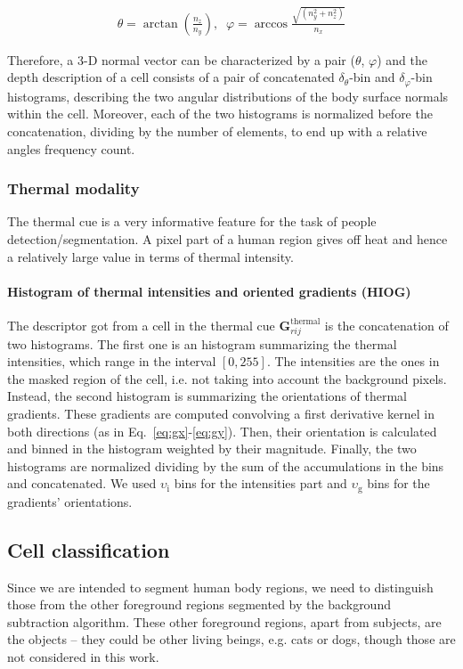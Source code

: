 \documentclass[10pt,twocolumn,letterpaper]{article}
\begin{document}
\begin{gather}	
	\theta  = \arctan{\left( \frac{n_z}{n_y} \right)},\;\;
	\varphi = \arccos{\frac{ \sqrt{(n_y^2 + n_z^2)} }{n_x}}
\end{gather}

Therefore, a 3-D normal vector can be characterized by a pair ($\theta$, $\varphi$) and the depth description of a cell consists of a pair of concatenated $\delta_\theta$-bin and $\delta_\varphi$-bin histograms, describing the two angular distributions of the body surface normals within the cell. Moreover, each of the two histograms is normalized before the concatenation, dividing by the number of elements, to end up with a relative angles frequency count.

\subsubsection{Thermal modality}
\label{sssec:thermal}

The thermal cue is a very informative feature for the task of people detection/segmentation. A pixel part of a human region gives off heat and hence a relatively large value in terms of thermal intensity.

\paragraph{Histogram of thermal intensities and oriented gradients (HIOG)} 
The descriptor got from a cell in the thermal cue $\mathbf{G}_{rij}^{\mathrm{thermal}}$ is the concatenation of two histograms. The first one is an histogram summarizing the thermal intensities, which range in the interval $[0, 255]$. The intensities are the ones in the masked region of the cell, i.e. not taking into account the background pixels. Instead, the second histogram is summarizing the orientations of thermal gradients. These gradients are computed convolving a first derivative kernel in both directions (as in Eq.~\ref{eq:gx}-\ref{eq:gy}). Then, their orientation is calculated and binned in the histogram weighted by their magnitude. Finally, the two histograms are normalized dividing by the sum of the accumulations in the bins and concatenated. We used $\upsilon_{\mathrm{i}}$ bins for the intensities part and $\upsilon_{\mathrm{g}}$ bins for the gradients' orientations.


\subsection{Cell classification}
Since we are intended to segment human body regions, we need to distinguish those from the other foreground regions segmented by the background subtraction algorithm. These other foreground regions, apart from subjects, are the objects -- they could be other living beings, e.g. cats or dogs, though those are not considered in this work.
\end{document}
